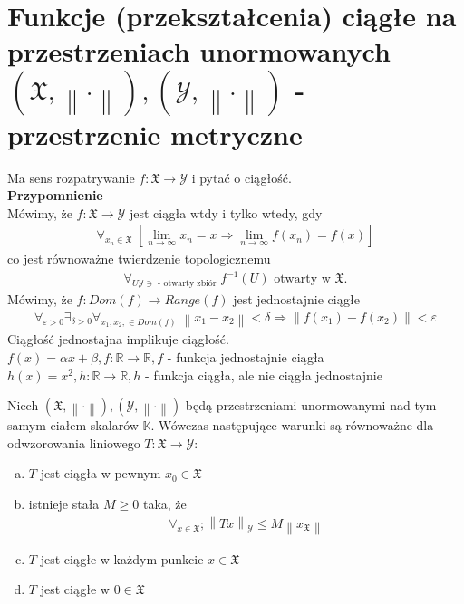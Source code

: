 \section{Funkcje (przekształcenia) ciągłe na przestrzeniach unormowanych $ \left(\mathfrak X,\left\|\cdot \right\|\right),\left(\mathcal Y,\left\|\cdot \right\|\right) $ - przestrzenie metryczne}
Ma sens rozpatrywanie $ f:\mathfrak X\to \mathcal Y $ i pytać o ciągłość.\\
\textbf{Przypomnienie}\\
Mówimy, że $ f:\mathfrak X\to \mathcal Y $ jest ciągła wtdy i tylko wtedy, gdy
\begin{gather*}
\forall_{x_n\in\mathfrak X}\;
\left[\lim\limits_{n\to\infty}x_n=x\Rightarrow\lim\limits_{n\to\infty}f(x_n)=f(x)  \right]
\end{gather*}
co jest równoważne twierdzenie topologicznemu
\begin{gather*}
\forall_{U\mathcal Y\ni\text{ - otwarty zbiór}}\;f^{-1}(U)\text{ otwarty w }\mathfrak X.
\end{gather*}
Mówimy, że $ f:Dom(f)\to Range (f) $ jest jednostajnie ciągłe
\begin{gather*}
\forall_{\varepsilon>0}\exists_{\delta>0}\forall_{x_1,x_2,\in Dom(f)}\;
\left\|x_1-x_2\right\|<\delta\Rightarrow\left\|f(x_1)-f(x_2)\right\|<\varepsilon
\end{gather*}
Ciągłość jednostajna implikuje ciągłość.\\
$ f(x)=\alpha x+\beta,f:\mathbb R \to \mathbb R ,f $ - funkcja jednostajnie ciągła\\
$ h(x)=x^2,h:\mathbb R \to \mathbb R , h $ - funkcja ciągła, ale nie ciągła jednostajnie
\begin{twr}
Niech $ \left(\mathfrak X,\left\|\cdot \right\|\right),\left(\mathcal Y,\left\|\cdot \right\|\right) $ będą przestrzeniami unormowanymi nad tym samym ciałem skalarów $ \mathbb K $. Wówczas następujące warunki są równoważne dla odwzorowania liniowego $ T:\mathfrak X\to \mathcal Y $:
\begin{enumerate}[a)]
\item $ T $ jest ciągła w pewnym $ x_0\in \mathfrak X $
\item istnieje stała $ M\ge 0 $ taka, że
\begin{gather*}
\forall_{x\in\mathfrak X};\left\|Tx\right\|_\mathcal Y\le M\left\|x_\mathfrak X \right\|
\end{gather*}
\item $ T $ jest ciągłe w każdym punkcie $ x\in\mathfrak X $
\item $ T $ jest ciągłe w $ 0\in \mathfrak X $
\end{enumerate}
\end{twr}
